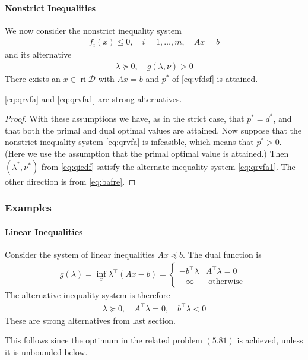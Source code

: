 \documentclass{article}
\newcommand{\ri}{\operatorname{ri}}
\begin{document}
\paragraph{Nonstrict Inequalities}
We now consider the nonstrict inequality system
\begin{align}
f_{i}(x) \leq 0, \quad i=1, \ldots, m, \quad A x=b\label{eq:qrvfa}
\end{align}
and its alternative
\begin{align}
\lambda \succeq 0, \quad g(\lambda, \nu)>0\label{eq:qrvfa1}
\end{align}
 There exists an $x \in \ri \mathcal{D}$ with $A x=b$ and $p^{* }$ of \cref{eq:vfdsf} is attained.

 \cref{eq:qrvfa} and \cref{eq:qrvfa1} are strong alternatives.
\begin{proof}\color{ForestGreen}
 With these assumptions we have, as in the strict case, that $p^{* }=d^{* }$, and that both the primal and dual optimal values are attained. Now suppose that the nonstrict inequality system \cref{eq:qrvfa}  is infeasible, which means that $p^{* }>0$. (Here we use the assumption that the primal optimal value is attained.) Then $\left(\lambda^{* }, \nu^{* }\right)$ from \cref{eq:qiedf} satisfy the alternate inequality system \cref{eq:qrvfa1}. The other direction is from \cref{eq:bafre}.
\end{proof}
\subsubsection{Examples}
\paragraph{Linear Inequalities}
Consider the system of linear inequalities $A x \preceq b .$ The dual function is
\begin{align*}
g(\lambda)=\inf _{x} \lambda^{\top}(A x-b)= \begin{cases}-b^{\top} \lambda & A^{\top} \lambda=0 \\ -\infty & \text { otherwise }\end{cases}
\end{align*}
The alternative inequality system is therefore
\begin{align*}
\lambda \succeq 0, \quad A^{\top} \lambda=0, \quad b^{\top} \lambda<0
\end{align*}
These are strong alternatives from last section. 

 This follows since the optimum in the related problem $(5.81)$ is achieved, unless it is unbounded below.
\end{document}
